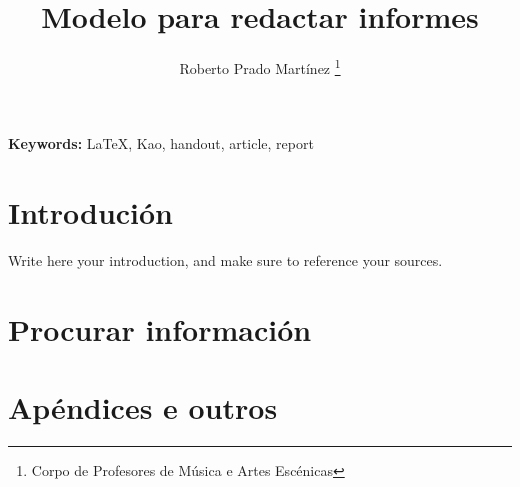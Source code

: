 \documentclass[
]{kaohandt}
\begin{document}

\title[Guía para utilizar o Kao Report]{Modelo para redactar informes}

\author[RPM]{Roberto Prado Martínez \thanks{Corpo de Profesores de Música e 
Artes Escénicas}}
%


\maketitle

\margintoc

\begin{abstract}
\noindent
\blindtext
\end{abstract}

{\noindent\textbf{Keywords:} \LaTeX, Kao, handout, article, report}

\medskip


\section{Introdución}

Write here your introduction, and make sure to 
reference your sources.

\blindtext{}

\section{Procurar información}


\appendix %

\section{Apéndices e outros}

\blindtext



\end{document}
